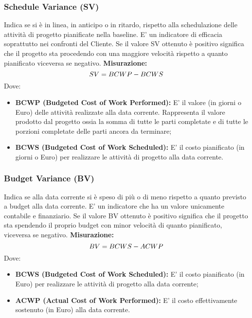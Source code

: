 	 	\subsubsection{Schedule Variance (SV)} Indica se si è in linea, in anticipo o in ritardo, rispetto alla schedulazione delle
attività di progetto pianificate nella baseline.
	 	E' un indicatore di efficacia soprattutto nei confronti del Cliente.
	 	Se il valore SV ottenuto è positivo significa che il progetto sta procedendo con una
maggiore velocità rispetto a quanto pianificato viceversa se negativo.\newline
	 	\textbf{Misurazione:}
\newline
	 	\[
	 		SV = BCWP-BCWS \newline
	 	\]
 		Dove:
 		\begin{itemize}
 			\item \textbf{BCWP (Budgeted Cost of Work Performed):} E' il valore (in giorni
o Euro) delle attività realizzate alla data corrente. Rappresenta il valore
prodotto dal progetto ossia la somma di tutte le parti completate e di tutte
le porzioni completate delle parti ancora da terminare;
 			\item \textbf{BCWS (Budgeted Cost of Work Scheduled):} E' il costo pianificato (in giorni o Euro) per realizzare le attività di progetto alla data corrente. \newline
 		\end{itemize}
	 	\subsubsection{Budget Variance (BV)} Indica se alla data corrente si è speso di più o di meno rispetto a quanto previsto
a budget alla data corrente.
	 	E' un indicatore che ha un valore unicamente contabile e finanziario.
	 	Se il valore BV ottenuto è positivo significa che il progetto sta spendendo il proprio
budget con minor velocità di quanto pianificato, viceversa se negativo.\newline
	 	\textbf{Misurazione:}
\newline
	 	\[
	 		BV = BCWS-ACWP \newline
	 	\]
	 	Dove:
	 	\begin{itemize}
	 		\item \textbf{BCWS (Budgeted Cost of Work Scheduled):} E' il costo pianificato (in Euro) per realizzare le attività di progetto alla data corrente;

	 		\item \textbf{ACWP (Actual Cost of Work Performed):} E' il costo effettivamente sostenuto (in Euro) alla data corrente.
\newline
	 	\end{itemize}
